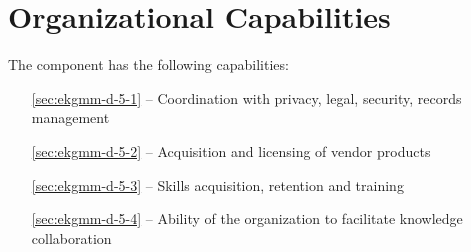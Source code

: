 \chapter{Organizational Capabilities}\label{ch:ekgmm-d-5}

The  component has the following capabilities:

\begin{itemize}[leftmargin=.5in]
  \item [\ref{sec:ekgmm-d-5-1}]  -- Coordination with privacy, legal, security, records management
  \item [\ref{sec:ekgmm-d-5-2}]  -- Acquisition and licensing of vendor products
  \item [\ref{sec:ekgmm-d-5-3}]  -- Skills acquisition, retention and training
  \item [\ref{sec:ekgmm-d-5-4}]  -- Ability of the organization to facilitate knowledge collaboration
\end{itemize}









